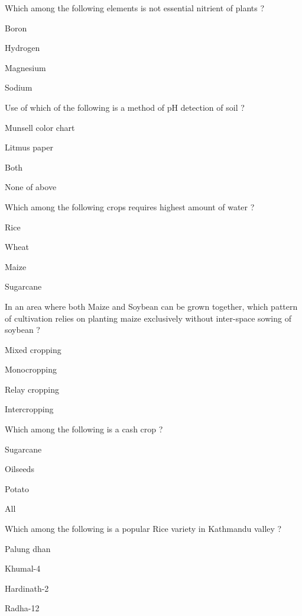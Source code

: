 \begin{questions}
\question Which among the following elements is not essential nitrient of plants ?
\begin{items}
\item Boron
\item Hydrogen
\item Magnesium
\item* Sodium
\end{items}

\question Use of which of the following is a method of pH detection of soil ?
\begin{items}
\item Munsell color chart
\item* Litmus paper
\item Both
\item None of above
\end{items}

\question Which among the following crops requires highest amount of water ?
\begin{items}
\item Rice
\item Wheat
\item Maize
\item* Sugarcane
\end{items}

\question In an area where both Maize and Soybean can be grown together, which pattern of cultivation relies on planting maize exclusively without inter-space sowing of soybean ?
\begin{items}
\item Mixed cropping
\item* Monocropping
\item Relay cropping
\item Intercropping
\end{items}

\question Which among the following is a cash crop ?
\begin{items}
\item Sugarcane
\item Oilseeds
\item Potato
\item* All
\end{items}

\question Which among the following is a popular Rice variety in Kathmandu valley ?
\begin{items}
\item Palung dhan
\item* Khumal-4
\item Hardinath-2
\item Radha-12
\end{items}


\end{questions}
